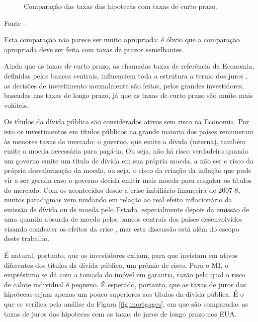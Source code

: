 \documentclass[
	12pt,				%
	oneside,			%
	a4paper,			%
	chapter=TITLE,		%
	section=TITLE,		%
	english,			%
	brazil				%
	]{abntex2}
\newcommand{\bcenter}{\begin{center}}
\newcommand{\ecenter}{\end{center}}
\begin{document}
\begin{refsection}
\begin{figure}[H]
{}

\caption{Comparação das taxas das hipotecas com taxas de curto prazo.}\label{fig:rates}
\end{figure}
\bcenter

\small Fonte -- \textcite[p.~35]{malpezziAftermath}
\ecenter

Esta comparação não parece ser muito apropriada: é óbvio que a comparação
apropriada deve ser feita com taxas de prazos semelhantes.

Ainda que as taxas de curto prazo, as chamadas taxas de referência da Economia,
definidas pelos bancos centrais, influenciem toda a estrutura a termo dos juros
\autocite[79]{resende}, as decisões de investimento normalmente são feitas, pelos
grandes investidores, baseadas nas taxas de longo prazo, já que as taxas de
curto prazo são muito mais voláteis.

Os títulos da dívida pública são considerados ativos sem risco na Economia. Por
isto os investimentos em títulos públicos na grande maioria dos países remuneram
às menores taxas do mercado: o governo, que emite a dívida (interna), também
emite a moeda necessária para pagá-la. Ou seja, não há risco verdadeiro quando
um governo emite um título de dívida em sua própria moeda, a não ser o risco da
própria desvalorização da moeda, ou seja, o risco da criação da inflação que
pode vir a ser gerada caso o governo decida emitir mais moeda para resgatar os
títulos do mercado. Com os acontecidos desde a crise imbiliário-financeira de
2007-8, muitos paradigmas vem mudando em relação ao real efeito inflacionário da
emissão de dívida ou de moeda pelo Estado, especialmente depois da emissão de
uma quantia absurda de moeda pelos bancos centrais dos países desenvolvidos
visando combater os efeitos da crise \autocite{resendeFSP}, mas esta discussão está além
do escopo deste trabalho.

É natural, portanto, que os investidores exijam, para que invistam em ativos
diferentes dos títulos da dívida pública, um prêmio de risco. Para o \gls{MI}, o
empréstimo se dá com a tomada do imóvel em garantia, razão pela qual o risco de
calote individual é pequeno. É esperado, portanto, que as taxas de juros das
hipotecas sejam apenas um pouco superiores aos títulos da dívida pública. É o
que se verifica pela análise da Figura \ref{fig:mortgages}, em que são
comparadas as taxas de juros das hipotecas com as taxas de juros de longo prazo
nos EUA.
\begin{figure}[H]


\end{figure}
\end{refsection}
\end{document}
